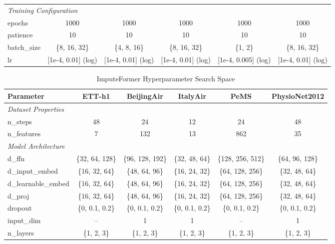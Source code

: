 \begin{table}[H]
\begin{adjustbox}{max width=\textwidth}
\begin{small}
\begin{tabular}{l|ccccc}
\midrule
\multicolumn{6}{l}{\textit{Training Configuration}} \\
epochs & 1000 & 1000 & 1000 & 1000 & 1000 \\
patience & 10 & 10 & 10 & 10 & 10 \\
batch\_size & \{8, 16, 32\} & \{4, 8, 16\} & \{8, 16, 32\} & \{1, 2\} & \{8, 16, 32\} \\
lr & [1e-4, 0.01] (log) & [1e-4, 0.01] (log) & [1e-4, 0.01] (log) & [1e-4, 0.005] (log) & [1e-4, 0.01] (log) \\
\bottomrule
\end{tabular}
\end{small}
\end{adjustbox}
\end{table}


\begin{table}[H]
\centering
\caption{ImputeFormer Hyperparameter Search Space}
\label{tab:hyperparam_imputeformer}
\begin{adjustbox}{max width=\textwidth}
\begin{small}
\begin{tabular}{l|ccccc}
\toprule
\textbf{Parameter} & \textbf{ETT-h1} & \textbf{BeijingAir} & \textbf{ItalyAir} & \textbf{PeMS} & \textbf{PhysioNet2012} \\
\midrule
\multicolumn{6}{l}{\textit{Dataset Properties}} \\
n\_steps & 48 & 24 & 12 & 24 & 48 \\
n\_features & 7 & 132 & 13 & 862 & 35 \\
\midrule
\multicolumn{6}{l}{\textit{Model Architecture}} \\
d\_ffn & \{32, 64, 128\} & \{96, 128, 192\} & \{32, 48, 64\} & \{128, 256, 512\} & \{64, 96, 128\} \\
d\_input\_embed & \{16, 32, 64\} & \{48, 64, 96\} & \{16, 24, 32\} & \{64, 128, 256\} & \{32, 48, 64\} \\
d\_learnable\_embed & \{16, 32, 64\} & \{48, 64, 96\} & \{16, 24, 32\} & \{64, 128, 256\} & \{32, 48, 64\} \\
d\_proj & \{16, 32, 64\} & \{48, 64, 96\} & \{16, 24, 32\} & \{64, 128, 256\} & \{32, 48, 64\} \\
dropout & \{0, 0.1, 0.2\} & \{0, 0.1, 0.2\} & \{0, 0.1, 0.2\} & \{0, 0.1, 0.2\} & \{0, 0.1, 0.2\} \\
input\_dim & -- & 1 & 1 & -- & 1 \\
n\_layers & \{1, 2, 3\} & \{1, 2, 3\} & \{1, 2, 3\} & \{1, 2, 3\} & \{1, 2, 3\} \\

\end{tabular}
\end{small}
\end{adjustbox}
\end{table}
